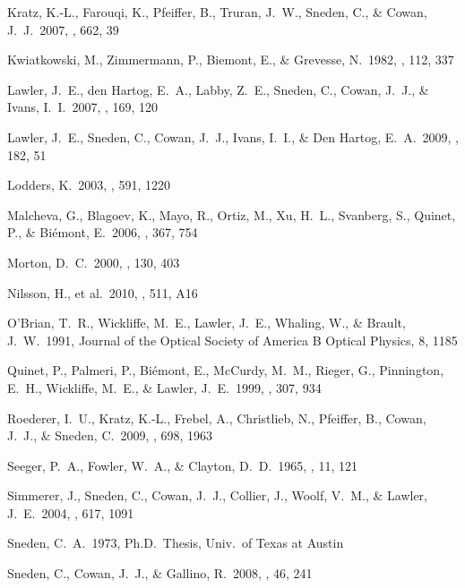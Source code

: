 \documentclass{emulateapj}
\begin{document}
\begin{thebibliography}{}
 Kratz, K.-L., Farouqi, 
K., Pfeiffer, B., Truran, J.~W., Sneden, C., 
\& Cowan, J.~J.\ 2007, \apj, 662, 39 

 Kwiatkowski, M., 
Zimmermann, P., Biemont, E., \& Grevesse, N.\ 1982, \aap, 112, 337 

 Lawler, J.~E., den 
Hartog, E.~A., Labby, Z.~E., Sneden, C., Cowan, J.~J., 
\& Ivans, I.~I.\ 2007, \apjs, 169, 120 

 Lawler, J.~E., Sneden, 
C., Cowan, J.~J., Ivans, I.~I., \& Den Hartog, E.~A.\ 2009, \apjs, 182, 51 

 Lodders, K.\ 2003, \apj, 591, 1220 

 Malcheva, G., Blagoev, 
K., Mayo, R., Ortiz, M., Xu, H.~L., Svanberg, S., Quinet, P., 
\& Bi{\'e}mont, E.\ 2006, \mnras, 367, 754 

 Morton, D.~C.\ 2000, \apjs, 130, 403 

 Nilsson, H., et al.\ 2010, \aap, 
511, A16 

 O'Brian, T.~R., 
Wickliffe, M.~E., Lawler, J.~E., Whaling, W., \& Brault, J.~W.\ 1991, 
Journal of the Optical Society of America B Optical Physics, 8, 1185 

 Quinet, P., Palmeri, P., 
Bi{\'e}mont, E., McCurdy, M.~M., Rieger, G., Pinnington, E.~H., Wickliffe, 
M.~E., \& Lawler, J.~E.\ 1999, \mnras, 307, 934 

 Roederer, I.~U., 
Kratz, K.-L., Frebel, A., Christlieb, N., Pfeiffer, B., Cowan, J.~J., 
\& Sneden, C.\ 2009, \apj, 698, 1963 

 Seeger, P.~A., Fowler, 
W.~A., \& Clayton, D.~D.\ 1965, \apjs, 11, 121 

 Simmerer, J., Sneden, 
C., Cowan, J.~J., Collier, J., Woolf, V.~M., \& Lawler, J.~E.\ 2004, \apj, 
617, 1091 

 Sneden, C.~A.\ 1973, 
Ph.D.~Thesis, Univ.\ of Texas at Austin

 Sneden, C., Cowan, J.~J., \& 
Gallino, R.\ 2008, \araa, 46, 241 


\end{thebibliography}
\end{document}
